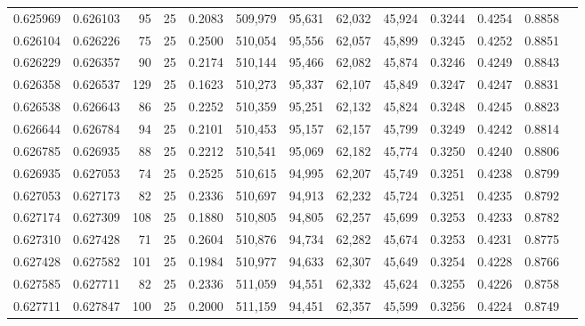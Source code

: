 \begin{tabular}{rrrrrrrrrrrrr}
0.625969 & 0.626103 &    95 &  25 &                                     0.2083 & 509,979 &  95,631 &  62,032 &  45,924 & 0.3244 & 0.4254 & 0.8858 \\
0.626104 & 0.626226 &    75 &  25 &                                     0.2500 & 510,054 &  95,556 &  62,057 &  45,899 & 0.3245 & 0.4252 & 0.8851 \\
0.626229 & 0.626357 &    90 &  25 &                                     0.2174 & 510,144 &  95,466 &  62,082 &  45,874 & 0.3246 & 0.4249 & 0.8843 \\
0.626358 & 0.626537 &   129 &  25 &                                     0.1623 & 510,273 &  95,337 &  62,107 &  45,849 & 0.3247 & 0.4247 & 0.8831 \\
0.626538 & 0.626643 &    86 &  25 &                                     0.2252 & 510,359 &  95,251 &  62,132 &  45,824 & 0.3248 & 0.4245 & 0.8823 \\
0.626644 & 0.626784 &    94 &  25 &                                     0.2101 & 510,453 &  95,157 &  62,157 &  45,799 & 0.3249 & 0.4242 & 0.8814 \\
0.626785 & 0.626935 &    88 &  25 &                                     0.2212 & 510,541 &  95,069 &  62,182 &  45,774 & 0.3250 & 0.4240 & 0.8806 \\
0.626935 & 0.627053 &    74 &  25 &                                     0.2525 & 510,615 &  94,995 &  62,207 &  45,749 & 0.3251 & 0.4238 & 0.8799 \\
0.627053 & 0.627173 &    82 &  25 &                                     0.2336 & 510,697 &  94,913 &  62,232 &  45,724 & 0.3251 & 0.4235 & 0.8792 \\
0.627174 & 0.627309 &   108 &  25 &                                     0.1880 & 510,805 &  94,805 &  62,257 &  45,699 & 0.3253 & 0.4233 & 0.8782 \\
0.627310 & 0.627428 &    71 &  25 &                                     0.2604 & 510,876 &  94,734 &  62,282 &  45,674 & 0.3253 & 0.4231 & 0.8775 \\
0.627428 & 0.627582 &   101 &  25 &                                     0.1984 & 510,977 &  94,633 &  62,307 &  45,649 & 0.3254 & 0.4228 & 0.8766 \\
0.627585 & 0.627711 &    82 &  25 &                                     0.2336 & 511,059 &  94,551 &  62,332 &  45,624 & 0.3255 & 0.4226 & 0.8758 \\
0.627711 & 0.627847 &   100 &  25 &                                     0.2000 & 511,159 &  94,451 &  62,357 &  45,599 & 0.3256 & 0.4224 & 0.8749 \\

\end{tabular}
